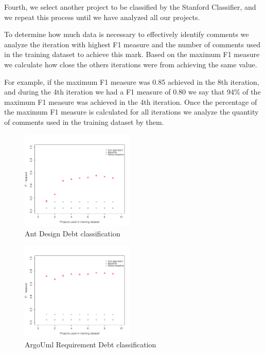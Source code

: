 Fourth, we select another project to be classified by the Stanford Classifier, and we repeat this process until we have analyzed all our projects.
 
To determine how much data is necessary to effectively identify \SATD comments we analyze the iteration with highest F1 measure and the number of comments used in the training dataset to achieve this mark. Based on the maximum F1 measure we calculate how close the others iterations were from achieving the same value.

For example, if the maximum F1 measure was 0.85 achieved in the 8th iteration, and during the 4th iteration we had a F1 measure of 0.80 we say that 94\% of the maximum F1 measure was achieved in the 4th iteration. Once the percentage of the maximum F1 measure is calculated for all iterations we analyze the quantity of comments used in the training dataset by them.

\begin{figure}[t]
  \centering
  \includegraphics[width = 0.48\textwidth]{figures/design_ant.pdf}
  \vspace{-3mm}
  \caption{Ant Design Debt classification}
  \label{fig:design_ant_result}
\end{figure}

\begin{figure}[t]
  \centering
  \includegraphics[width = 0.48\textwidth]{figures/implementation_argo.pdf}
  \vspace{-3mm}
  \caption{ArgoUml Requirement Debt classification}
  \label{fig:implementation_argo_result}
\end{figure}

